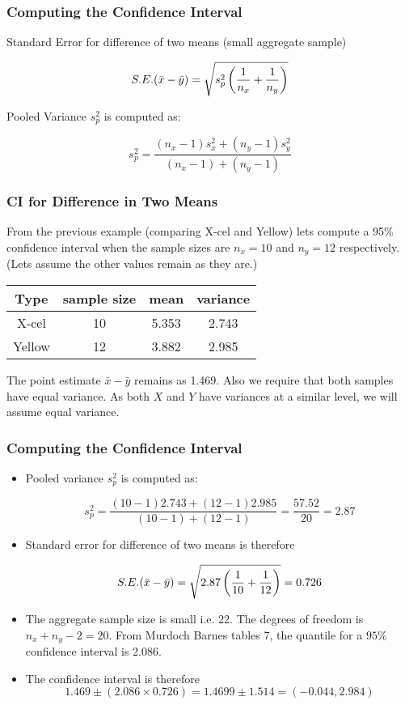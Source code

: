 \documentclass[a4]{beamer}
\begin{document}
\begin{frame}

\frametitle{Computing the Confidence Interval}
Standard Error for difference of two means (small aggregate sample)

\[ S.E.(\bar{x}-\bar{y}) = \sqrt{  s^2_p \left({1\over n_x}+{1\over n_y} \right)} \]

Pooled Variance $s^2_p$ is computed as:

\[ s^2_p = \frac{(n_x-1)s^2_x + (n_y-1)s^2_y}{(n_x-1) + (n_y-1)} \]
\end{frame}
\begin{frame}
\frametitle{CI for Difference in Two Means}
From the previous example (comparing X-cel and Yellow) lets compute a 95\% confidence interval when the sample sizes are $n_x=10$ and $n_y=12$ respectively. (Lets assume the other values remain as they are.)
\begin{center}
\begin{tabular}{|c|c|c|c|}
\hline
Type & sample size & mean & variance \\ \hline
X-cel & 10 & 5.353 & 2.743 \\ \hline
Yellow & 12 & 3.882 & 2.985 \\ \hline
\end{tabular}
\end{center}
The point estimate $\bar{x} - \bar{y}$ remains as 1.469. Also we require that both samples have equal variance. As both $X$ and $Y$ have variances at a similar level, we will assume equal variance.

\end{frame}
\begin{frame}

\frametitle{Computing the Confidence Interval}
\begin{itemize} \item Pooled variance $s^2_p$ is computed as:

\[ s^2_p = \frac{(10-1)2.743 + (12-1)2.985}{(10-1) + (12-1)}  = \frac{57.52}{20} = 2.87\]

\item Standard error for difference of two means is therefore

\[ S.E.(\bar{x}-\bar{y}) = \sqrt{  2.87 \left({1\over 10}+{1\over 12} \right)} = 0.726 \]

\item The aggregate sample size is small i.e. 22. The degrees of freedom is $n_x+n_y-2 = 20$.
From Murdoch Barnes tables 7, the quantile for a $95\%$ confidence interval is 2.086.

\item The confidence interval is therefore
\[ 1.469  \pm (2.086 \times 0.726) = 1.4699 \pm 1.514 =  (-0.044, 2.984 )  \]
\end{itemize}
\end{frame}
\end{document}
